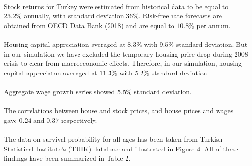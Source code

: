 \documentclass[]{article}
\begin{document}
\paragraph{}Stock returns for Turkey were estimated from historical data to be equal to $23.2\%$ annually, with standard deviation $36\%$. Risk-free rate forecasts are obtained from OECD Data Bank (2018) and are equal to $10.8\%$ per annum.

\paragraph{}Housing capital appreciation averaged at $8.3\%$ with $9.5\%$ standard deviation. But in our simulation we have excluded the temporary housing price drop during 2008 crisis to clear from macroeconomic effects. Therefore, in our simulation, housing capital appreciaton averaged at $11.3\%$ with $5.2\%$ standard deviation.

\paragraph{}Aggregate wage growth series showed $5.5\%$ standard deviation.

\paragraph{}The correlations between house and stock prices, and house prices and wages gave $0.24$ and $0.37$ respectively.

\paragraph{}The data on survival probability for all ages has been taken from Turkish Statistical Institute's (TUIK) database and illustrated in Figure 4. All of these findings have been summarized in Table 2. 
\end{document}
